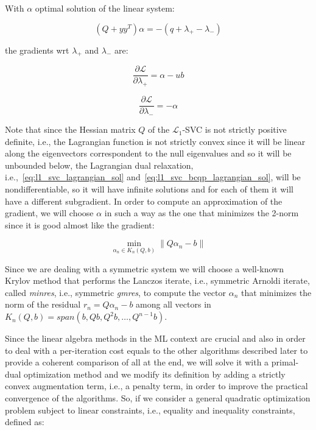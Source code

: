 With $\alpha$ optimal solution of the linear system:

\begin{equation} \label{eq:l1_svc_bcqp_lagrangian_sol}
    (Q + yy^T) \alpha = - (q + \lambda_+ - \lambda_-)
\end{equation}

the gradients wrt $\lambda_+$ and $\lambda_-$ are:

\begin{equation} \label{eq:l1_svc_bcqp_lagrangian_der_lp}
	\frac{\partial \mathcal{L}}{\partial \lambda_+}=\alpha - ub
\end{equation}

\begin{equation} \label{eq:l1_svc_bcqp_lagrangian_der_lm}
    \frac{\partial \mathcal{L}}{\partial \lambda_-}=-\alpha
\end{equation}

\bigskip

Note that since the Hessian matrix $Q$ of the $\mathcal{L}_1$-SVC is not strictly positive definite, i.e., the Lagrangian function is not strictly convex since it will be linear along the eigenvectors correspondent to the null eigenvalues and so it will be unbounded below, the Lagrangian dual relaxation, i.e.,~\ref{eq:l1_svc_lagrangian_sol} and~\ref{eq:l1_svc_bcqp_lagrangian_sol}, will be nondifferentiable, so it will have infinite solutions and for each of them it will have a different subgradient. In order to compute an approximation of the gradient, we will choose $\alpha$ in such a way as the one that minimizes the 2-norm since it is good almost like the gradient:

\begin{equation} \label{eq:svc_lagrangian_krylov_sol}
	\min_{\alpha_n \in K_n(Q, b)} \| Q \alpha_n - b \|
\end{equation}

Since we are dealing with a symmetric system we will choose a well-known Krylov method that performs the Lanczos iterate, i.e., symmetric Arnoldi iterate, called \emph{minres}, i.e., symmetric \emph{gmres}, to compute the vector $\alpha_n$ that minimizes the norm of the residual $r_n = Q \alpha_n - b$ among all vectors in $K_n(Q, b) = span(b, Qb, Q^2b, \dots, Q^{n-1}b)$.

\bigskip

Since the linear algebra methods in the ML context are crucial and also in order to deal with a per-iteration cost equals to the other algorithms described later to provide a coherent comparison of all at the end, we will solve it with a primal-dual optimization method and we modify its definition by adding a strictly convex augmentation term, i.e., a penalty term, in order to improve the practical convergence of the algorithms. So, if we consider a general quadratic optimization problem subject to linear constraints, i.e., equality and inequality constraints, defined as:


